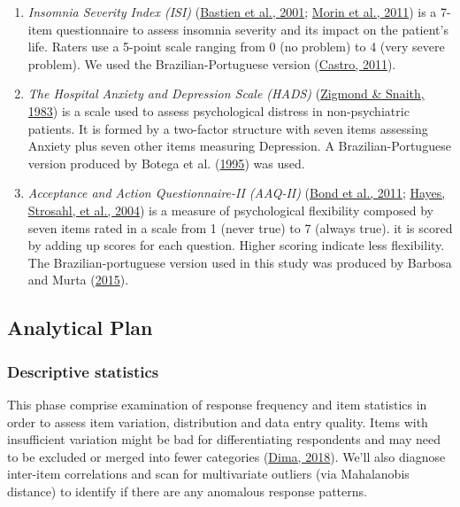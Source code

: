 \documentclass[
  ,doc,11pt, twoside,floatsintext]{apa6}
\begin{document}
\begin{enumerate}
\def\labelenumi{\arabic{enumi}.}
\item
  \emph{Insomnia Severity Index (ISI)} (\protect\hyperlink{ref-bastien2001}{Bastien et al., 2001}; \protect\hyperlink{ref-morin2011a}{Morin et al., 2011}) is a 7-item questionnaire to assess insomnia severity and its impact on the patient's life. Raters use a 5-point scale ranging from 0 (no problem) to 4 (very severe problem). We used the Brazilian-Portuguese version (\protect\hyperlink{ref-castro}{Castro, 2011}).
\item
  \emph{The Hospital Anxiety and Depression Scale (HADS)} (\protect\hyperlink{ref-zigmond1983hospital}{Zigmond \& Snaith, 1983}) is a scale used to assess psychological distress in non-psychiatric patients. It is formed by a two-factor structure with seven items assessing Anxiety plus seven other items measuring Depression. A Brazilian-Portuguese version produced by Botega et al. (\protect\hyperlink{ref-botega1995transtornos}{1995}) was used.
\item
  \emph{Acceptance and Action Questionnaire-II (AAQ-II)} (\protect\hyperlink{ref-bond2011preliminary}{Bond et al., 2011}; \protect\hyperlink{ref-hayes2004measuring}{Hayes, Strosahl, et al., 2004}) is a measure of psychological flexibility composed by seven items rated in a scale from 1 (never true) to 7 (always true). it is scored by adding up scores for each question. Higher scoring indicate less flexibility. The Brazilian-portuguese version used in this study was produced by Barbosa and Murta (\protect\hyperlink{ref-barbosa2015propriedades}{2015}).
\end{enumerate}

\hypertarget{analytical-plan}{%
\subsection{Analytical Plan}\label{analytical-plan}}

\hypertarget{descriptive-statistics}{%
\subsubsection{Descriptive statistics}\label{descriptive-statistics}}

This phase comprise examination of response frequency and item statistics in order to assess item variation, distribution and data entry quality. Items with insufficient variation might be bad for differentiating respondents and may need to be excluded or merged into fewer categories (\protect\hyperlink{ref-dima2018}{Dima, 2018}). We'll also diagnose inter-item correlations and scan for multivariate outliers (via Mahalanobis distance) to identify if there are any anomalous response patterns.
\end{document}

